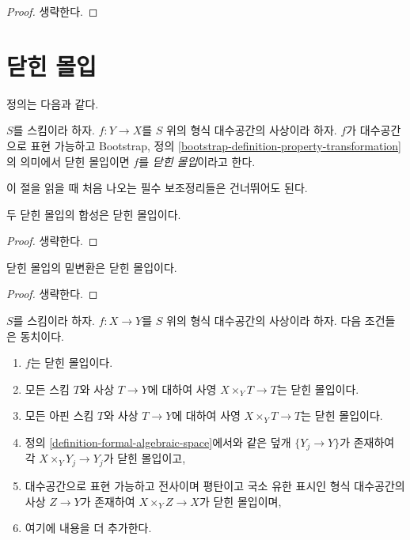 \begin{proof}
생략한다.
\end{proof}

\section{닫힌 몰입}
\label{section-closed-immersions}

\noindent
정의는 다음과 같다.

\begin{definition}
\label{definition-closed-immersion}
$S$를 스킴이라 하자. $f : Y \to X$를 $S$ 위의 형식 대수공간의
사상이라 하자. $f$가 대수공간으로 표현 가능하고 Bootstrap, 정의
\ref{bootstrap-definition-property-transformation}의 의미에서 닫힌 몰입이면
$f$를 {\it 닫힌 몰입}이라고 한다.
\end{definition}

\noindent
이 절을 읽을 때 처음 나오는 필수 보조정리들은 건너뛰어도 된다. %

\begin{lemma}
\label{lemma-composition-closed-immersion}
두 닫힌 몰입의 합성은 닫힌 몰입이다.
\end{lemma}

\begin{proof}
생략한다.
\end{proof}

\begin{lemma}
\label{lemma-base-change-closed-immersion}
닫힌 몰입의 밑변환은 닫힌 몰입이다.
\end{lemma}

\begin{proof}
생략한다.
\end{proof}

\begin{lemma}
\label{lemma-characterize-closed-immersion}
$S$를 스킴이라 하자. $f : X \to Y$를 $S$ 위의 형식 대수공간의
사상이라 하자. 다음 조건들은 동치이다.
\begin{enumerate}
\item $f$는 닫힌 몰입이다.
\item 모든 스킴 $T$와 사상 $T \to Y$에 대하여 사영
$X \times_Y T \to T$는 닫힌 몰입이다.
\item 모든 아핀 스킴 $T$와 사상 $T \to Y$에 대하여
사영 $X \times_Y T \to T$는 닫힌 몰입이다.
\item 정의 \ref{definition-formal-algebraic-space}에서와 같은 덮개
$\{Y_j \to Y\}$가 존재하여 각 $X \times_Y Y_j \to Y_j$가 닫힌 몰입이고,
\item 대수공간으로 표현 가능하고 전사이며 평탄이고 국소 유한 표시인
형식 대수공간의 사상 $Z \to Y$가 존재하여
$X \times_Y Z \to X$가 닫힌 몰입이며, %
\item 여기에 내용을 더 추가한다. %
\end{enumerate}
\end{lemma}

